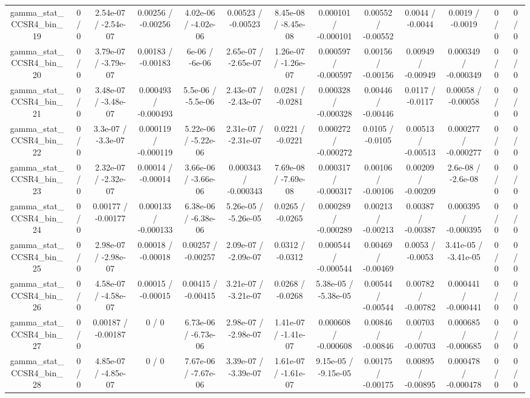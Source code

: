 \documentclass[10pt]{article}
\begin{document}
\begin{table}[htbp]
\begin{center}
\begin{tabular}{|c|c|c|c|c|c|c|c|c|c|c|c|c|}
  gamma_stat_CCSR4_bin_19 & 0 / 0 & 2.54e-07 / -2.54e-07 & 0.00256 / -0.00256 & 4.02e-06 / -4.02e-06 & 0.00523 / -0.00523 & 8.45e-08 / -8.45e-08 & 0.000101 / -0.000101 & 0.00552 / -0.00552 & 0.0044 / -0.0044 & 0.0019 / -0.0019 & 0 / 0 & 0 / 0 \\ 
  gamma_stat_CCSR4_bin_20 & 0 / 0 & 3.79e-07 / -3.79e-07 & 0.00183 / -0.00183 & 6e-06 / -6e-06 & 2.65e-07 / -2.65e-07 & 1.26e-07 / -1.26e-07 & 0.000597 / -0.000597 & 0.00156 / -0.00156 & 0.00949 / -0.00949 & 0.000349 / -0.000349 & 0 / 0 & 0 / 0 \\ 
  gamma_stat_CCSR4_bin_21 & 0 / 0 & 3.48e-07 / -3.48e-07 & 0.000493 / -0.000493 & 5.5e-06 / -5.5e-06 & 2.43e-07 / -2.43e-07 & 0.0281 / -0.0281 & 0.000328 / -0.000328 & 0.00446 / -0.00446 & 0.0117 / -0.0117 & 0.00058 / -0.00058 & 0 / 0 & 0 / 0 \\ 
  gamma_stat_CCSR4_bin_22 & 0 / 0 & 3.3e-07 / -3.3e-07 & 0.000119 / -0.000119 & 5.22e-06 / -5.22e-06 & 2.31e-07 / -2.31e-07 & 0.0221 / -0.0221 & 0.000272 / -0.000272 & 0.0105 / -0.0105 & 0.00513 / -0.00513 & 0.000277 / -0.000277 & 0 / 0 & 0 / 0 \\ 
  gamma_stat_CCSR4_bin_23 & 0 / 0 & 2.32e-07 / -2.32e-07 & 0.00014 / -0.00014 & 3.66e-06 / -3.66e-06 & 0.000343 / -0.000343 & 7.69e-08 / -7.69e-08 & 0.000317 / -0.000317 & 0.00106 / -0.00106 & 0.00209 / -0.00209 & 2.6e-08 / -2.6e-08 & 0 / 0 & 0 / 0 \\ 
  gamma_stat_CCSR4_bin_24 & 0 / 0 & 0.00177 / -0.00177 & 0.000133 / -0.000133 & 6.38e-06 / -6.38e-06 & 5.26e-05 / -5.26e-05 & 0.0265 / -0.0265 & 0.000289 / -0.000289 & 0.00213 / -0.00213 & 0.00387 / -0.00387 & 0.000395 / -0.000395 & 0 / 0 & 0 / 0 \\ 
  gamma_stat_CCSR4_bin_25 & 0 / 0 & 2.98e-07 / -2.98e-07 & 0.00018 / -0.00018 & 0.00257 / -0.00257 & 2.09e-07 / -2.09e-07 & 0.0312 / -0.0312 & 0.000544 / -0.000544 & 0.00469 / -0.00469 & 0.0053 / -0.0053 & 3.41e-05 / -3.41e-05 & 0 / 0 & 0 / 0 \\ 
  gamma_stat_CCSR4_bin_26 & 0 / 0 & 4.58e-07 / -4.58e-07 & 0.00015 / -0.00015 & 0.00415 / -0.00415 & 3.21e-07 / -3.21e-07 & 0.0268 / -0.0268 & 5.38e-05 / -5.38e-05 & 0.00544 / -0.00544 & 0.00782 / -0.00782 & 0.000441 / -0.000441 & 0 / 0 & 0 / 0 \\ 
  gamma_stat_CCSR4_bin_27 & 0 / 0 & 0.00187 / -0.00187 & 0 / 0 & 6.73e-06 / -6.73e-06 & 2.98e-07 / -2.98e-07 & 1.41e-07 / -1.41e-07 & 0.000608 / -0.000608 & 0.00846 / -0.00846 & 0.00703 / -0.00703 & 0.000685 / -0.000685 & 0 / 0 & 0 / 0 \\ 
  gamma_stat_CCSR4_bin_28 & 0 / 0 & 4.85e-07 / -4.85e-07 & 0 / 0 & 7.67e-06 / -7.67e-06 & 3.39e-07 / -3.39e-07 & 1.61e-07 / -1.61e-07 & 9.15e-05 / -9.15e-05 & 0.00175 / -0.00175 & 0.00895 / -0.00895 & 0.000478 / -0.000478 & 0 / 0 & 0 / 0 \\ 

\end{tabular}
\end{center}
\end{table}
\end{document}
